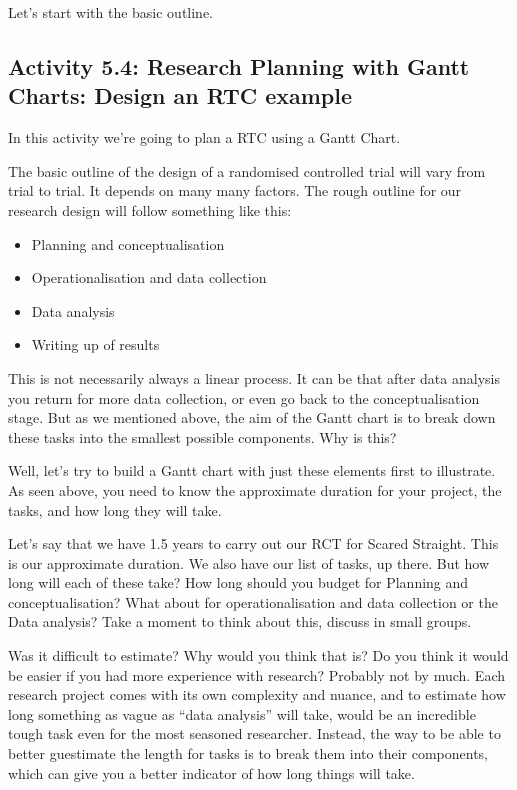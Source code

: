 \documentclass[
]{book}
\providecommand{\tightlist}{%
  \setlength{\itemsep}{0pt}\setlength{\parskip}{0pt}}
\begin{document}
Let's start with the basic outline.

\hypertarget{activity-5.4-research-planning-with-gantt-charts-design-an-rtc-example}{%
\subsection{Activity 5.4: Research Planning with Gantt Charts: Design an RTC example}\label{activity-5.4-research-planning-with-gantt-charts-design-an-rtc-example}}

In this activity we're going to plan a RTC using a Gantt Chart.

The basic outline of the design of a randomised controlled trial will vary from trial to trial. It depends on many many factors. The rough outline for our research design will follow something like this:

\begin{itemize}
\tightlist
\item
  Planning and conceptualisation
\item
  Operationalisation and data collection
\item
  Data analysis
\item
  Writing up of results
\end{itemize}

This is not necessarily always a linear process. It can be that after data analysis you return for more data collection, or even go back to the conceptualisation stage. But as we mentioned above, the aim of the Gantt chart is to break down these tasks into the smallest possible components. Why is this?

Well, let's try to build a Gantt chart with just these elements first to illustrate. As seen above, you need to know the approximate duration for your project, the tasks, and how long they will take.

Let's say that we have 1.5 years to carry out our RCT for Scared Straight. This is our approximate duration. We also have our list of tasks, up there. But how long will each of these take? How long should you budget for Planning and conceptualisation? What about for operationalisation and data collection or the Data analysis? Take a moment to think about this, discuss in small groups.

Was it difficult to estimate? Why would you think that is? Do you think it would be easier if you had more experience with research? Probably not by much. Each research project comes with its own complexity and nuance, and to estimate how long something as vague as ``data analysis'' will take, would be an incredible tough task even for the most seasoned researcher. Instead, the way to be able to better guestimate the length for tasks is to break them into their components, which can give you a better indicator of how long things will take.
\end{document}
